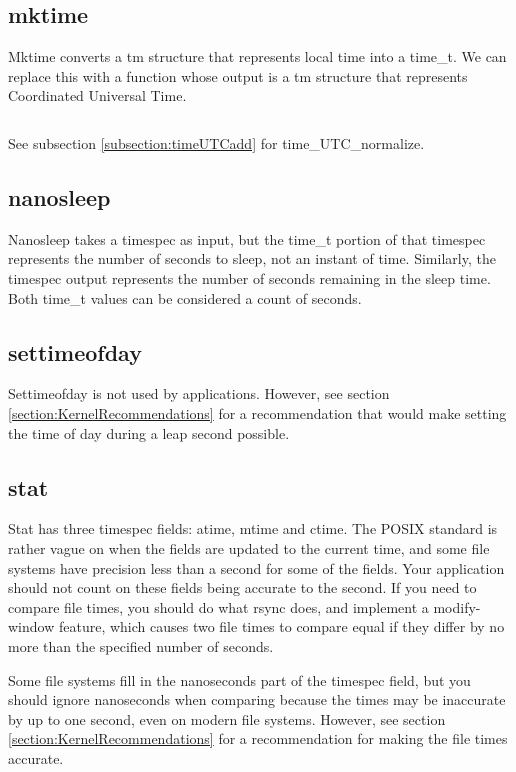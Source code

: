 \documentclass[letterpaper,twoside]{article}
\begin{document}
\subsection{mktime}
\label{subsection:mktime}
Mktime converts a {\ttfamily tm} structure that represents local time into a
{\ttfamily time\_t}.  We can replace this with a function whose output is a
{\ttfamily tm} structure that represents Coordinated Universal Time.
\inputminted[firstline=32]{c}{time_local_to_utc.c}
See subsection \ref{subsection:timeUTCadd} for time\_UTC\_normalize.

\subsection{nanosleep}
Nanosleep takes a timespec as input, but the {\ttfamily time\_t} portion of that
timespec represents the number of seconds to sleep, not an instant of
time.  Similarly, the timespec output represents the number of seconds
remaining in the sleep time.  Both {\ttfamily time\_t} values can be considered
a count of seconds.

\subsection{settimeofday}
Settimeofday is not used by applications.
However, see section \ref{section:KernelRecommendations} for a recommendation
that would make setting the time of day during a leap second possible.

\subsection{stat}
Stat has three timespec fields: atime, mtime and ctime.  The POSIX standard
is rather vague on when the fields are updated to the current time, and
some file systems have precision less than a second for some of the fields.
Your application should not count on these fields being accurate to
the second.  If you need to compare file times, you should do what
rsync does, and implement a modify-window feature, which causes two
file times to compare equal if they differ by no more than the specified
number of seconds.

Some file systems fill in the nanoseconds part of the timespec field,
but you should ignore nanoseconds when comparing because the times may be
inaccurate by up to one second, even on modern file systems.
However, see section \ref{section:KernelRecommendations} for a
recommendation for making the file times accurate.
\end{document}
